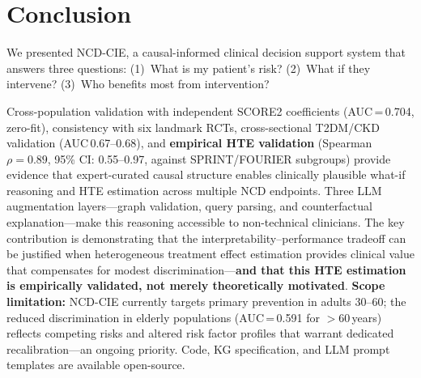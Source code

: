 \documentclass[runningheads]{llncs}
\begin{document}
\section{Conclusion}\label{sec:conclusion}

We presented NCD-CIE, a causal-informed clinical decision support
system that answers three questions:
(1)~What is my patient's risk?
(2)~What if they intervene?
(3)~Who benefits most from intervention?

Cross-population validation with independent SCORE2 coefficients
(AUC\,=\,0.704, zero-fit), consistency with six landmark RCTs,
cross-sectional T2DM/CKD validation (AUC\,0.67--0.68), and
\textbf{empirical HTE validation} (Spearman $\rho = 0.89$, 95\% CI:
0.55--0.97, against SPRINT/FOURIER subgroups) provide evidence that
expert-curated causal structure enables clinically plausible what-if
reasoning and HTE estimation across multiple NCD endpoints.
Three LLM augmentation layers---graph validation, query parsing,
and counterfactual explanation---make this reasoning accessible
to non-technical clinicians.
The key contribution is demonstrating that the interpretability--performance
tradeoff can be justified when heterogeneous treatment effect
estimation provides clinical value that compensates for modest
discrimination---\textbf{and that this HTE estimation is empirically
validated, not merely theoretically motivated}.
\textbf{Scope limitation:} NCD-CIE currently targets primary
prevention in adults 30--60; the reduced discrimination in elderly
populations (AUC\,=\,0.591 for $>$60\,years) reflects competing
risks and altered risk factor profiles that warrant dedicated
recalibration---an ongoing priority.
Code, KG specification, and LLM prompt templates are available
open-source.
\end{document}
